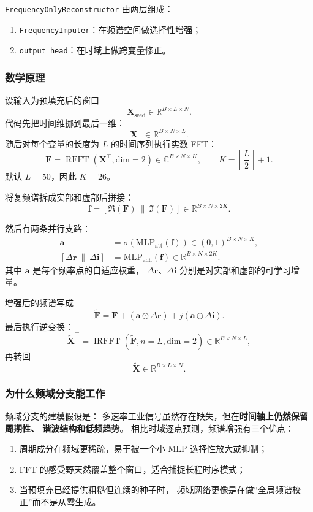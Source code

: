 \documentclass[UTF8,11pt,a4paper]{ctexart}
\DeclareMathOperator{\RFFT}{RFFT}
\DeclareMathOperator{\IRFFT}{IRFFT}
\begin{document}
\texttt{FrequencyOnlyReconstructor} 由两层组成：
\begin{enumerate}
  \item \texttt{FrequencyImputer}：在频谱空间做选择性增强；
  \item \texttt{output\_head}：在时域上做跨变量修正。
\end{enumerate}

\subsubsection{数学原理}

设输入为预填充后的窗口
\[
\bm{X}_{\mathrm{seed}}\in\mathbb{R}^{B\times L\times N}.
\]
代码先把时间维挪到最后一维：
\[
\bm{X}^{\top}\in\mathbb{R}^{B\times N\times L}.
\]
随后对每个变量的长度为 $L$ 的时间序列执行实数 FFT：
\[
\bm{F}=\RFFT(\bm{X}^{\top},\mathrm{dim}=2)\in\mathbb{C}^{B\times N\times K},
\qquad
K=\left\lfloor\frac{L}{2}\right\rfloor+1.
\]
默认 $L=50$，因此 $K=26$。

将复频谱拆成实部和虚部后拼接：
\[
\bm{f}=[\Re(\bm{F})\ \|\ \Im(\bm{F})]\in\mathbb{R}^{B\times N\times 2K}.
\]

然后有两条并行支路：
\begin{align}
\bm{a} &= \sigma\!\left(\mathrm{MLP}_{\mathrm{att}}(\bm{f})\right)
\in (0,1)^{B\times N\times K}, \\
[\Delta \bm{r}\ \|\ \Delta \bm{i}] &=
\mathrm{MLP}_{\mathrm{enh}}(\bm{f})
\in \mathbb{R}^{B\times N\times 2K}.
\end{align}
其中 $\bm{a}$ 是每个频率点的自适应权重，
$\Delta \bm{r}$、$\Delta \bm{i}$ 分别是对实部和虚部的可学习增量。

增强后的频谱写成
\[
\tilde{\bm{F}}
=
\bm{F}
+
\left(\bm{a}\odot \Delta \bm{r}\right)
+
j\left(\bm{a}\odot \Delta \bm{i}\right).
\]
最后执行逆变换：
\[
\tilde{\bm{X}}^{\top}=\IRFFT(\tilde{\bm{F}},n=L,\mathrm{dim}=2)
\in\mathbb{R}^{B\times N\times L},
\]
再转回
\[
\tilde{\bm{X}}\in\mathbb{R}^{B\times L\times N}.
\]

\subsubsection{为什么频域分支能工作}

频域分支的建模假设是：
多速率工业信号虽然存在缺失，但在\textbf{时间轴上仍然保留周期性、
谐波结构和低频趋势}。
相比时域逐点预测，频谱增强有三个优点：
\begin{enumerate}
  \item 周期成分在频域更稀疏，易于被一个小 MLP 选择性放大或抑制；
  \item FFT 的感受野天然覆盖整个窗口，适合捕捉长程时序模式；
  \item 当预填充已经提供粗糙但连续的种子时，
  频域网络更像是在做“全局频谱校正”而不是从零生成。
\end{enumerate}
\end{document}
